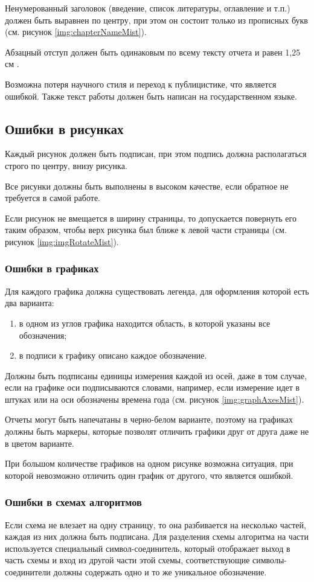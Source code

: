 Ненумерованный заголовок (введение, список литературы, оглавление и т.п.) должен быть выравнен по центру, при этом он состоит только из прописных букв (см. рисунок \ref{img:chapterNameMist}).

Абзацный отступ должен быть одинаковым по всему тексту отчета и равен 1,25 см \cite{GOST732}.

Возможна потеря научного стиля и переход к публицистике, что является ошибкой. Также текст работы должен быть написан на государственном языке.

\subsection{Ошибки в рисунках}
Каждый рисунок должен быть подписан, при этом подпись должна располагаться строго по центру, внизу рисунка.

Все рисунки должны быть выполнены в высоком качестве, если обратное не требуется в самой работе.

Если рисунок не вмещается в ширину страницы, то допускается повернуть его таким образом, чтобы верх рисунка был ближе к левой части страницы (см. рисунок \ref{img:imgRotateMist}).

\subsubsection{Ошибки в графиках}
Для каждого графика должна существовать легенда, для оформления которой есть два варианта:
\begin{enumerate}
	\item в одном из углов графика находится область, в которой указаны все обозначения;
	\item в подписи к графику описано каждое обозначение.
\end{enumerate}

Должны быть подписаны единицы измерения каждой из осей, даже в том случае, если на графике оси подписываются словами, например, если измерение идет в штуках или на оси обозначены времена года (см. рисунок \ref{img:graphAxesMist}).

Отчеты могут быть напечатаны в черно-белом варианте, поэтому на графиках должны быть маркеры, которые позволят отличить графики друг от друга даже не в цветом варианте.

При большом количестве графиков на одном рисунке возможна ситуация, при которой невозможно отличить один график от другого, что является ошибкой.

\subsubsection{Ошибки в схемах алгоритмов}
Если схема не влезает на одну страницу, то она разбивается на несколько частей, каждая из них должна быть подписана. Для разделения схемы алгоритма на части используется специальный символ-соединитель, который отображает выход в часть схемы и вход из другой части этой схемы, соответствующие символы-соединители должны содержать одно и то же уникальное обозначение.

